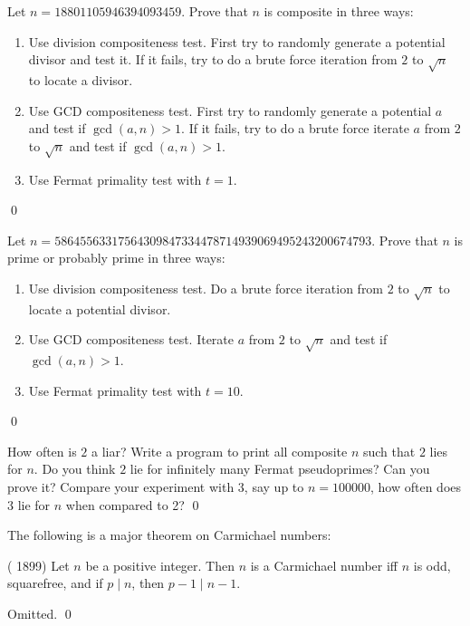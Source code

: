 \begin{ex}
  Let $n = 18801105946394093459$.
  Prove that $n$ is composite in three ways:
  \begin{enumerate}[nosep,label=\textnormal{(\alph*)}]
  \item Use division compositeness test.
    First try to
    randomly generate a potential divisor and test it.
    If it fails, try to do a brute force iteration from $2$ to $\sqrt{n}$
    to locate a divisor.
  \item Use GCD compositeness test.
    First try to
    randomly generate a potential $a$ and test if $\gcd(a, n) > 1$.
    If it fails, try to do a brute force iterate $a$ from $2$ to $\sqrt{n}$
    and test if $\gcd(a, n) > 1$.
  \item
    Use Fermat primality test with $t = 1$.
  \end{enumerate}
  \qed
\end{ex}

\begin{ex}
  Let $n = 58645563317564309847334478714939069495243200674793$.
  Prove that $n$ is prime or probably prime in three ways:
  \begin{enumerate}[nosep,label=\textnormal{(\alph*)}]
  \item Use division compositeness test.
    Do a brute force iteration from $2$ to $\sqrt{n}$
    to locate a potential divisor.
  \item Use GCD compositeness test.
    Iterate $a$ from $2$ to $\sqrt{n}$
    and test if $\gcd(a, n) > 1$.
  \item
    Use Fermat primality test with $t = 10$.
  \end{enumerate}
  \qed  
\end{ex}

\begin{ex}
  How often is $2$ a liar?
  Write a program to print all composite $n$ such that $2$ lies for $n$.
  Do you think $2$ lie for infinitely many Fermat pseudoprimes?
  Can you prove it?
  Compare your experiment with 3, say up to $n = 100000$,
  how often does 3 lie for $n$ when compared to 2?
  \qed
\end{ex}

The following is a major theorem on Carmichael numbers:

\begin{thm} \textnormal{( 1899)}
  Let $n$ be a positive integer.
  Then $n$ is a Carmichael number iff $n$ is odd, squarefree, and
  if $p \mid n$, then $p-1 \mid n-1$.
\end{thm}
\proof
Omitted.
\qed

